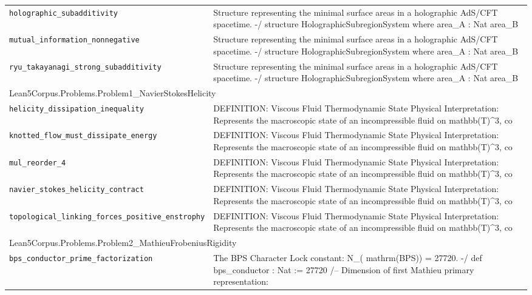 \begin{longtable}{p{}p{}}
\quad\texttt{\footnotesize holographic\_subadditivity} & {\footnotesize Structure representing the minimal surface areas in a holographic AdS/CFT spacetime. -/ structure HolographicSubregionSystem where area\_A : Nat area\_B} \\
\quad\texttt{\footnotesize mutual\_information\_nonnegative} & {\footnotesize Structure representing the minimal surface areas in a holographic AdS/CFT spacetime. -/ structure HolographicSubregionSystem where area\_A : Nat area\_B} \\
\quad\texttt{\footnotesize ryu\_takayanagi\_strong\_subadditivity} & {\footnotesize Structure representing the minimal surface areas in a holographic AdS/CFT spacetime. -/ structure HolographicSubregionSystem where area\_A : Nat area\_B} \\
\multicolumn{2}{l}{\textsf{\small Lean5Corpus.Problems.Problem1\_NavierStokesHelicity}} \\
\quad\texttt{\footnotesize helicity\_dissipation\_inequality} & {\footnotesize DEFINITION: Viscous Fluid Thermodynamic State Physical Interpretation: Represents the macroscopic state of an incompressible fluid on  mathbb(T)\^{}3, co} \\
\quad\texttt{\footnotesize knotted\_flow\_must\_dissipate\_energy} & {\footnotesize DEFINITION: Viscous Fluid Thermodynamic State Physical Interpretation: Represents the macroscopic state of an incompressible fluid on  mathbb(T)\^{}3, co} \\
\quad\texttt{\footnotesize mul\_reorder\_4} & {\footnotesize DEFINITION: Viscous Fluid Thermodynamic State Physical Interpretation: Represents the macroscopic state of an incompressible fluid on  mathbb(T)\^{}3, co} \\
\quad\texttt{\footnotesize navier\_stokes\_helicity\_contract} & {\footnotesize DEFINITION: Viscous Fluid Thermodynamic State Physical Interpretation: Represents the macroscopic state of an incompressible fluid on  mathbb(T)\^{}3, co} \\
\quad\texttt{\footnotesize topological\_linking\_forces\_positive\_enstrophy} & {\footnotesize DEFINITION: Viscous Fluid Thermodynamic State Physical Interpretation: Represents the macroscopic state of an incompressible fluid on  mathbb(T)\^{}3, co} \\
\multicolumn{2}{l}{\textsf{\small Lean5Corpus.Problems.Problem2\_MathieuFrobeniusRigidity}} \\
\quad\texttt{\footnotesize bps\_conductor\_prime\_factorization} & {\footnotesize The BPS Character Lock constant: N\_( mathrm(BPS)) = 27720. -/ def bps\_conductor : Nat := 27720 /-- Dimension of first Mathieu primary representation: } \\

\end{longtable}
